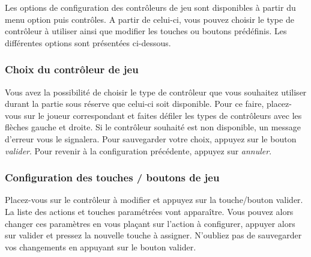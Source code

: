  Les options de configuration des contrôleurs de jeu sont disponibles à partir du menu option puis contrôles. A partir de celui-ci, vous pouvez choisir le type de contrôleur à utiliser ainsi que modifier les touches ou boutons 
prédéfinis. Les différentes options sont présentées ci-dessous.

\subsubsection{Choix du contrôleur de jeu}

Vous avez la possibilité de choisir le type de contrôleur que vous souhaitez utiliser durant la partie sous réserve que celui-ci soit disponible. Pour ce faire, placez-vous sur le joueur correspondant et faites défiler les types de contrôleurs avec les flèches gauche et droite. Si le contrôleur souhaité est non disponible, un message d'erreur vous le signalera. Pour sauvegarder votre choix, appuyez sur le bouton \textit{valider}. Pour revenir à la configuration précédente, appuyez sur \textit{annuler}.

\subsubsection{Configuration des touches / boutons de jeu}

	Placez-vous sur le contrôleur à modifier et appuyez sur la touche/bouton valider. La liste des actions et touches paramétrées vont apparaître. Vous pouvez alors changer ces paramètres en vous plaçant sur l'action à configurer, appuyer alors sur valider et pressez la nouvelle touche à assigner. N'oubliez pas de sauvegarder vos changements en appuyant sur le bouton valider.
	
	

